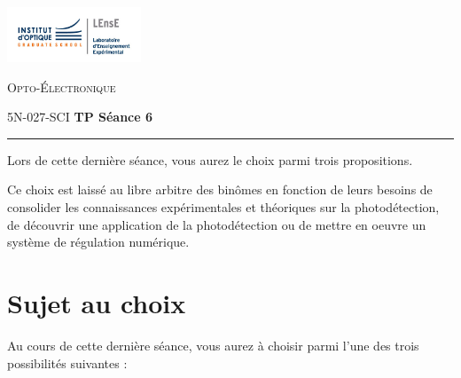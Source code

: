 \newpage

\begin{minipage}[c]{.25\linewidth}
	\includegraphics[width=4cm]{images/LEnsE_IOGS.jpg}
\end{minipage} \hfill
\begin{minipage}[c]{.4\linewidth}

\begin{center}
\vspace{0.3cm}
{\Large \textsc{Opto-Électronique}}

\medskip

5N-027-SCI \qquad \textbf{\Large TP Séance 6}

\end{center}
\end{minipage}\hfill

\bigskip

\noindent \rule{\linewidth}{1pt}

Lors de cette dernière séance, vous aurez le choix parmi trois propositions.

Ce choix est laissé au libre arbitre des binômes en fonction de leurs besoins de consolider les connaissances expérimentales et théoriques sur la photodétection, de découvrir une application de la photodétection ou de mettre en oeuvre un système de régulation numérique.

\section{Sujet au choix}

Au cours de cette dernière séance, vous aurez à choisir parmi l'une des trois possibilités suivantes :

